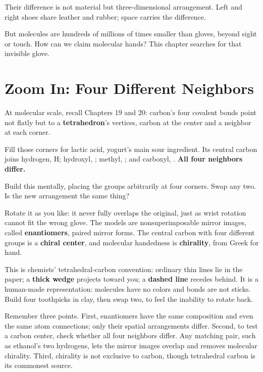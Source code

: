 Their difference is not material but three-dimensional arrangement. Left and right shoes share leather and rubber; space carries the difference.

But molecules are hundreds of millions of times smaller than gloves, beyond sight or touch. How can we claim molecular hands? This chapter searches for that invisible glove.

\section{Zoom In: Four Different Neighbors}

At molecular scale, recall Chapters 19 and 20: carbon's four covalent bonds point not flatly but to a \textbf{tetrahedron}'s vertices, carbon at the center and a neighbor at each corner.

Fill those corners for lactic acid, yogurt's main sour ingredient. Its central carbon joins hydrogen, H; hydroxyl, ; methyl, ; and carboxyl, . \textbf{All four neighbors differ.}

Build this mentally, placing the groups arbitrarily at four corners. Swap any two. Is the new arrangement the same thing?

Rotate it as you like: it never fully overlaps the original, just as wrist rotation cannot fit the wrong glove. The models are nonsuperimposable mirror images, called \textbf{enantiomers}, paired mirror forms. The central carbon with four different groups is a \textbf{chiral center}, and molecular handedness is \textbf{chirality}, from Greek for hand.


This is chemists' tetrahedral-carbon convention: ordinary thin lines lie in the paper; a \textbf{thick wedge} projects toward you; a \textbf{dashed line} recedes behind. It is a human-made representation: molecules have no colors and bonds are not sticks. Build four toothpicks in clay, then swap two, to feel the inability to rotate back.

Remember three points. First, enantiomers have the same composition and even the same atom connections; only their spatial arrangements differ. Second, to test a carbon center, check whether all four neighbors differ. Any matching pair, such as ethanol's two hydrogens, lets the mirror images overlap and removes molecular chirality. Third, chirality is not exclusive to carbon, though tetrahedral carbon is its commonest source.

